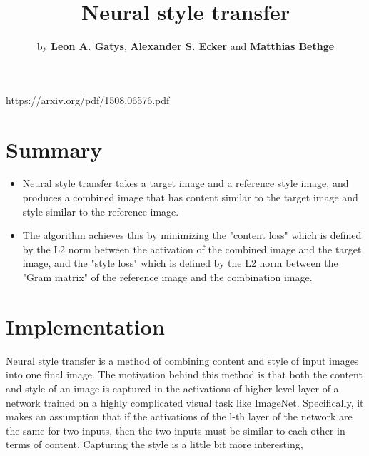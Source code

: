 \documentclass[graybox]{svmult}
\begin{document}
\title*{Neural style transfer}
\author{by \textbf{Leon A. Gatys}, \textbf{Alexander S. Ecker} and \textbf{Matthias Bethge}}


%
%
\maketitle

https://arxiv.org/pdf/1508.06576.pdf


\section{Summary}
\label{sec:1}

\begin{itemize}
  \item Neural style transfer takes a target image and a reference style image, and produces a combined image that has content similar to the target image and style similar to the reference image.
  
  \item The algorithm achieves this by minimizing the "content loss" which is defined by the L2 norm between the activation of the combined image and the target image, and the "style loss" which is defined by the L2 norm between the "Gram matrix" of the reference image and the combination image.
  
\end{itemize}

\section{Implementation}

Neural style transfer is a method of combining content and style of input images into one final image. The motivation behind this method is that both the content and style of an image is captured in the activations of higher level layer of a network trained on a highly complicated visual task like ImageNet. Specifically, it makes an assumption that if the activations of the l-th layer of the network are the same for two inputs, then the two inputs must be similar to each other in terms of content. Capturing the style is a little bit more interesting,
\end{document}
